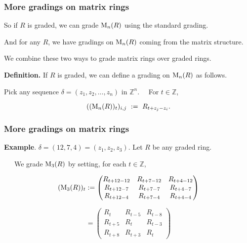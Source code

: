 \documentclass{beamer}
\begin{document}
\begin{frame}
\frametitle{More gradings on matrix rings}

So if $R$ is graded, we can grade  ${\rm M}_n(R)$ using the standard grading.  

\medskip

And for any $R$, we have gradings  on  ${\rm M}_n(R)$  coming from the matrix structure.  
\medskip

 We  combine these two ways to grade matrix rings over graded rings. 

\bigskip

{\bf Definition.}   If $R$ is graded, we can define a grading on ${\rm M}_n(R)$ as follows.  
 
 \medskip
 
 Pick any sequence $\delta = (z_1, z_2, \dots, z_n) $ in $ \mathbb{Z}^n$.  \ \   For $t\in \mathbb{Z}$, 
 
$$ (( {\rm M}_n(R) )_t )_{i,j}   \ := \  R_{t + z_j - z_i}. $$ 








\end{frame}

\begin{frame}
\frametitle{More gradings on matrix rings}



{\bf Example}.      $\delta = (12,7,4) = (z_1, z_2,z_3)$.   Let $R$ be any graded ring.  

\medskip
 
\ \ \   We grade ${\rm M}_3(R)$ by setting, for each $t \in \mathbb{Z}$, 




$$( {\rm M}_3(R) )_{t} :=  \begin{pmatrix}
R_{t +  12-12}  & R_{t +  7 - 12}  & R_{t + 4- 12}  \\
R_{t +  12-7}    & R_{t +  7 - 7}  & R_{t + 4 - 7} \\
 R_{t + 12-4} & R_{t + 7-4}  & R_{t + 4-4} 
\end{pmatrix}$$

\medskip

$$ =  \begin{pmatrix}
R_{t }  & R_{t -5}  & R_{t - 8}  \\
R_{t  + 5}    & R_{t }  & R_{t - 3} \\
 R_{t  + 8} & R_{t + 3}  & R_{t } 
\end{pmatrix}$$



\end{frame}
\end{document}
